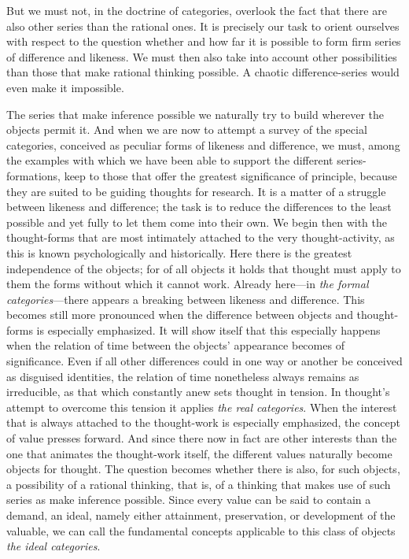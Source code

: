 \documentclass[12pt,a4paper]{book}
\newcommand{\opage}[1]{\marginnote{\footnotesize\textit{[#1]}}}
\begin{document}
But we must not, in the doctrine of categories, overlook the fact that there
are also other series than the rational ones. It is precisely our task to
orient ourselves with respect to the question whether and how far it is
possible to form firm series of difference and likeness. We must then also
take into account other possibilities than those that make rational thinking
\opage{174}possible. A chaotic difference-series would even make it impossible.

The series that make inference possible we naturally try to build wherever
the objects permit it. And when we are now to attempt a survey of the
special categories, conceived as peculiar forms of likeness and difference,
we must, among the examples with which we have been able to support the
different series-formations, keep to those that offer the greatest
significance of principle, because they are suited to be guiding thoughts
for research. It is a matter of a struggle between likeness and difference;
the task is to reduce the differences to the least possible and yet fully to
let them come into their own. We begin then with the thought-forms that are
most intimately attached to the very thought-activity, as this is known
psychologically and historically. Here there is the greatest independence of
the objects; for of all objects it holds that thought must apply to them the
forms without which it cannot work. Already here---in \emph{the formal
categories}---there appears a breaking between likeness and difference. This
becomes still more pronounced when the difference between objects and
thought-forms is especially emphasized. It will show itself that this
especially happens when the relation of time between the objects' appearance
becomes of significance. Even if all other differences could in one way or
another be conceived as disguised identities, the relation of time
nonetheless always remains as irreducible, as that which constantly anew
sets thought in tension. In thought's attempt to overcome this tension it
applies \emph{the real categories}. When the interest that is always
attached to the thought-work is especially emphasized, the concept of value
presses forward. And since there now in fact are other interests than the
one that animates the thought-work itself, the different values naturally
become objects for thought. The question becomes whether there is also, for
such objects, a possibility of a rational thinking, that is, of a thinking
that makes use of such series as make inference possible. Since every value
can be said to contain a demand, an \opage{175}ideal, namely either attainment,
preservation, or development of the valuable, we can call the fundamental
concepts applicable to this class of objects \emph{the ideal categories}.
\end{document}
